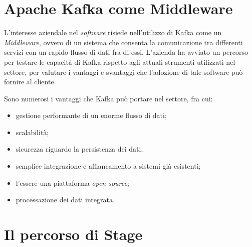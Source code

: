 

\section{Apache Kafka come Middleware}

L'interesse aziendale nel \textit{software} risiede nell'utilizzo di Kafka come un  \textit{Middleware}, ovvero di un sistema che consenta la comunicazione tra differenti servizi con un rapido flusso di dati fra di essi.
L'azienda ha avviato un percorso per testare le capacità di Kafka rispetto agli attuali strumenti utilizzati nel settore, per valutare i vantaggi e svantaggi che l'adozione di tale software può fornire al cliente.

\bigskip\noindent
Sono numerosi i vantaggi che Kafka può portare nel settore, fra cui:
\begin{itemize}
  \item gestione performante di un enorme flusso di dati;
  \item scalabilità;
  \item sicurezza riguardo la persistenza dei dati;
  \item semplice integrazione e affiancamento a sistemi già esistenti;
  \item l'essere una piattaforma \textit{open source};
  \item processazione dei dati integrata.
\end{itemize}


%

\section{Il percorso di Stage}

%
%

